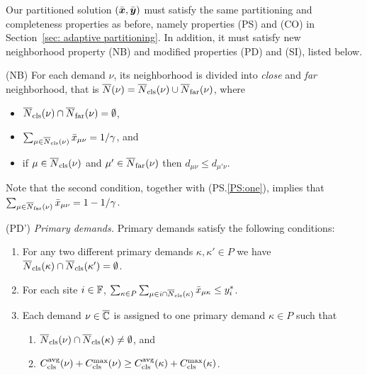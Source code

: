 Our partitioned solution $(\bar{\boldsymbol{x}},\bar{\boldsymbol{y}})$ must satisfy the
same partitioning and completeness properties as before, namely 
properties (PS) and (CO) in Section~\ref{sec: adaptive partitioning}.
In addition, it must satisfy new neighborhood property (NB) and
modified properties (PD) and (SI), listed below.

\begin{description}
	
      \renewcommand{\theenumii}{(\alph{enumii})}
      \renewcommand{\labelenumii}{\theenumii}

\item{(NB)} \label{NB}
	For each demand $\nu$, its neighborhood is divided into \emph{close} and
	\emph{far} neighborhood, that is ${\overline{N}}(\nu) = {\overline{N}}_{\text{cls}}(\nu) \cup {\overline{N}}_{\text{far}}(\nu)$, where
	\begin{itemize}
	\item ${\overline{N}}_{\text{cls}}(\nu) \cap {\overline{N}}_{\text{far}}(\nu) = \emptyset$,
	\item $\sum_{\mu\in{\overline{N}}_{\text{cls}}(\nu)} {\bar x}_{\mu\nu} =1/\gamma$, and 
	\item if $\mu\in {\overline{N}}_{\text{cls}}(\nu)$ and $\mu'\in {\overline{N}}_{\text{far}}(\nu)$ 
				then $d_{\mu\nu}\le d_{\mu'\nu}$.   
	\end{itemize}
	Note that the second condition, together with (PS.\ref{PS:one}), implies
	that $\sum_{\mu\in{\overline{N}}_{\text{far}}(\nu)} {\bar x}_{\mu\nu} =1-1/\gamma$.

\item{(PD')} \emph{Primary demands.}
	Primary demands satisfy the following conditions:

	\begin{enumerate}
		
	\item\label{PD1:disjoint}  For any two different primary demands $\kappa,\kappa'\in P$ we have
				${\overline{N}}_{\text{cls}}(\kappa)\cap {\overline{N}}_{\text{cls}}(\kappa') = \emptyset$.

	\item \label{PD1:yi} For each site $i\in\mathbb{F}$, 
		$ \sum_{\kappa\in P}\sum_{\mu\in i\cap{\overline{N}}_{\text{cls}}(\kappa)}{\bar x}_{\mu\kappa} \leq y_i^\ast$.
		
	\item \label{PD1:assign} Each demand $\nu\in\overline{\mathbb{C}}$ is assigned
        to one primary demand $\kappa\in P$ such that

  			\begin{enumerate}
	
				\item \label{PD1:assign:overlap} ${\overline{N}}_{\text{cls}}(\nu) \cap {\overline{N}}_{\text{cls}}(\kappa) \neq \emptyset$, and
				\item \label{PD1:assign:cost}
          $C_{\text{cls}}^{{\mbox{\scriptsize\rm avg}}}(\nu)+C_{\text{cls}}^{\max}(\nu) \geq
          C_{\text{cls}}^{{\mbox{\scriptsize\rm avg}}}(\kappa)+C_{\text{cls}}^{\max}(\kappa)$.
			\end{enumerate}


\end{enumerate}
\end{description}
